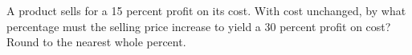 A product sells for a 15 percent profit on its cost. With cost unchanged, by what percentage must the selling price increase to yield a 30 percent profit on cost? Round to the nearest whole percent.

